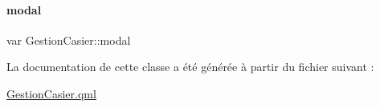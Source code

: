 \mbox{\label{class_gestion_casier_a69282746b4d8ccc4b8cc3eb48daa221f}} 
\paragraph{\texorpdfstring{modal}{modal}}
{\footnotesize\ttfamily var Gestion\+Casier\+::modal\hspace{0.3cm}{\ttfamily [private]}}



La documentation de cette classe a été générée à partir du fichier suivant \+:\begin{DoxyCompactItemize}
\item 
\hyperlink{_gestion_casier_8qml}{Gestion\+Casier.\+qml}\end{DoxyCompactItemize}
